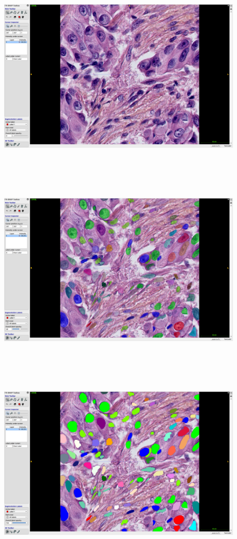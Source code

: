 \documentclass[a0,portrait]{a0poster}
\begin{document}
\begin{multicols}{2}
\includegraphics[height=10cm, width = 12cm]{Opacite0.png}
  \includegraphics[height=10cm, width = 12cm]{Opacite50.png}
   \includegraphics[height=10cm, width = 12cm]{Opacite100.png}


\end{multicols}
\end{document}
